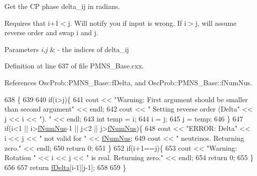 Get the CP phase delta\+\_\+ij in radians.

Requires that i+1$<$j. Will notify you if input is wrong. If i$>$j, will assume reverse order and swap i and j.


\begin{DoxyParams}{Parameters}
{\em i,j} & -\/ the indices of delta\+\_\+ij \\
\hline
\end{DoxyParams}


Definition at line 637 of file P\+M\+N\+S\+\_\+\+Base.\+cxx.



References Osc\+Prob\+::\+P\+M\+N\+S\+\_\+\+Base\+::f\+Delta, and Osc\+Prob\+::\+P\+M\+N\+S\+\_\+\+Base\+::f\+Num\+Nus.


\begin{DoxyCode}
638 \{
639 
640   \textcolor{keywordflow}{if}(i>j)\{
641     cout << \textcolor{stringliteral}{"Warning: First argument should be smaller than second argument"} << endl;
642     cout << \textcolor{stringliteral}{"         Setting reverse order (Delta"} << j << i << \textcolor{stringliteral}{"). "} << endl;
643     \textcolor{keywordtype}{int} temp = i;
644     i = j;
645     j = temp;
646   \}
647   \textcolor{keywordflow}{if}(i<1 || i>\hyperlink{classOscProb_1_1PMNS__Base_a24bb74bed63569dfe88b18fa6a08060e}{fNumNus}-1 || j<2 || j>\hyperlink{classOscProb_1_1PMNS__Base_a24bb74bed63569dfe88b18fa6a08060e}{fNumNus})\{
648     cout << \textcolor{stringliteral}{"ERROR: Delta"} << i << j << \textcolor{stringliteral}{" not valid for "} << \hyperlink{classOscProb_1_1PMNS__Base_a24bb74bed63569dfe88b18fa6a08060e}{fNumNus};
649     cout << \textcolor{stringliteral}{" neutrinos. Returning zero."} << endl;
650     \textcolor{keywordflow}{return} 0;
651   \}
652   \textcolor{keywordflow}{if}(i+1==j)\{
653     cout << \textcolor{stringliteral}{"Warning: Rotation "} << i << j << \textcolor{stringliteral}{" is real. Returning zero."} << endl;
654     \textcolor{keywordflow}{return} 0;
655   \}
656 
657   \textcolor{keywordflow}{return} \hyperlink{classOscProb_1_1PMNS__Base_ab2a5fa40e689b221c8a7d2c17213810d}{fDelta}[i-1][j-1];
658 
659 \}
\end{DoxyCode}
\mbox{\label{classOscProb_1_1PMNS__Base_ad26815ac5f4805d1259817e4936e5f8f}} 
